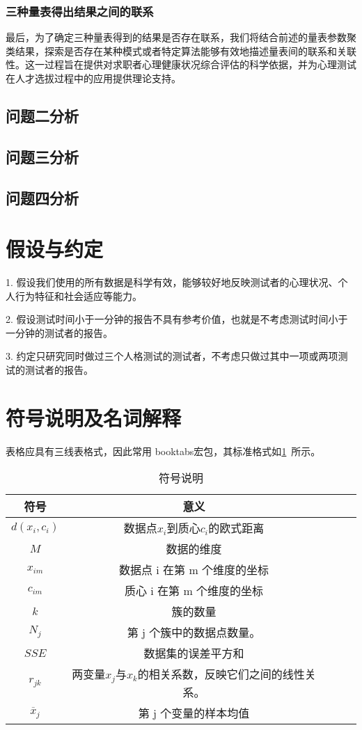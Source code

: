 \documentclass[withoutpreface,bwprint]{cumcmthesis} %
\begin{document}
\subsubsection*{三种量表得出结果之间的联系}

最后，为了确定三种量表得到的结果是否存在联系，我们将结合前述的量表参数聚类结果，探索是否存在某种模式或者特定算法能够有效地描述量表间的联系和关联性。这一过程旨在提供对求职者心理健康状况综合评估的科学依据，并为心理测试在人才选拔过程中的应用提供理论支持。

\subsection{问题二分析}

\subsection{问题三分析}

\subsection{问题四分析}

\section{假设与约定}
1. 假设我们使用的所有数据是科学有效，能够较好地反映测试者的心理状况、个人行为特征和社会适应等能力。

2. 假设测试时间小于一分钟的报告不具有参考价值，也就是不考虑测试时间小于一分钟的测试者的报告。

3. 约定只研究同时做过三个人格测试的测试者，不考虑只做过其中一项或两项测试的测试者的报告。

\section{符号说明及名词解释}
表格应具有三线表格式，因此常用 booktabs宏包，其标准格式如\cref{tab:001}~所示。
\begin{table}[!htbp]
    \caption{符号说明}\label{tab:001} \centering
    \begin{tabular}{ccccc}
        \toprule[1.5pt]
        符号 & 意义  \\
        \midrule[1pt]
        $d(x_i, c_i)$ & 数据点$x_i$到质心$c_i$的欧式距离 \\  
        $M$ & 数据的维度 \\   
        $x_{im}$ & 数据点 i 在第 m 个维度的坐标 \\
        $c_{im}$ & 质心 i 在第 m 个维度的坐标 \\
        $k$ & 簇的数量 \\
        $N_j$ &  第 j 个簇中的数据点数量。 \\
        $SSE$ & 数据集的误差平方和 \\
        $r_{jk}$ & 两变量$x_j$与$x_k$的相关系数，反映它们之间的线性关系。\\
        $\overline{x}_j $ & 第 j 个变量的样本均值 \\
        \bottomrule[1.5pt]
    \end{tabular}
\end{table}
\end{document}
